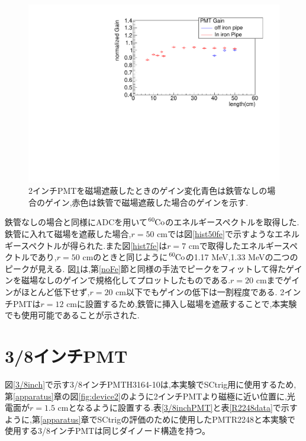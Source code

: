 \begin{figure}[tbp]
	\centering
		\includegraphics[angle=-90,width=15cm]{fig/iguchi/bigPMTfit.pdf}
	\caption{2インチPMTを磁場遮蔽したときのゲイン変化\newline 青色は鉄管なしの場合のゲイン,赤色は鉄管で磁場遮蔽した場合のゲインを示す.}
	\label{bigPMTfit}
\end{figure}

鉄管なしの場合と同様にADCを用いて$\ce{^{60}Co}$のエネルギースペクトルを取得した.
鉄管に入れて磁場を遮蔽した場合,$r=50$ cmでは図\ref{hist50fe}で示すようなエネルギースペクトルが得られた.また図\ref{hist7fe}は$r=7$ cmで取得したエネルギースペクトルであり,$r=50$ cmのときと同じように$\ce{^{60}Co}$の1.17 MeV,1.33 MeVの二つのピークが見える.
図\ref{bigPMTfit}は,第\ref{noFe}節と同様の手法でピークをフィットして得たゲインを磁場なしのゲインで規格化してプロットしたものである.$r=20$ cmまでゲインがほとんど低下せず,$r=20$ cm以下でもゲインの低下は一割程度である.
2インチPMTは$r=12$ cmに設置するため,鉄管に挿入し磁場を遮蔽することで,本実験でも使用可能であることが示された.


\newpage
\section{3/8インチPMT}
図\ref{3/8inch}で示す3/8インチPMT\hspace{3pt}H3164-10\cite{pmtH3164-10}は,本実験でSCtrig用に使用するため,第\ref{apparatus}章の図\ref{fig:device2}のように2インチPMTより磁極に近い位置に,光電面が$r=1.5$ cmとなるように設置する.表\ref{3/8inchPMT}と表\ref{R2248data}で示すように,第\ref{apparatus}章でSCtrigの評価のために使用したPMT\hspace{3pt}R2248\cite{pmtR2248}と本実験で使用する3/8インチPMT\cite{pmtH3164-10}は同じダイノード構造を持つ。

